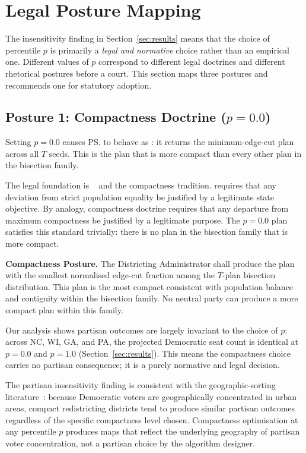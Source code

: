 \section{Legal Posture Mapping}
\label{sec:legal-posture}

The insensitivity finding in Section~\ref{sec:results} means that the choice
of percentile $p$ is primarily a \emph{legal and normative} choice rather
than an empirical one.
Different values of $p$ correspond to different legal doctrines and different
rhetorical postures before a court.
This section maps three postures and recommends one for statutory adoption.

\subsection{Posture 1: Compactness Doctrine ($p = 0.0$)}

Setting $p = 0.0$ causes \ps{} to behave as \cs{}: it returns the
minimum-edge-cut plan across all $T$ seeds.
This is the plan that is more compact than every other plan in the bisection
family.

The legal foundation is \karcher{}~\citep{karcher1983} and the compactness
tradition.
\karcher{} requires that any deviation from strict population equality be
justified by a legitimate state objective.
By analogy, compactness doctrine requires that any departure from maximum
compactness be justified by a legitimate purpose.
The $p = 0.0$ plan satisfies this standard trivially: there is no plan in
the bisection family that is more compact.

\begin{statute}
\textbf{Compactness Posture.}
The Districting Administrator shall produce the plan with the smallest
normalised edge-cut fraction among the $T$-plan bisection distribution.
This plan is the most compact consistent with population balance and
contiguity within the \ar{} bisection family.
No neutral party can produce a more compact plan within this family.
\end{statute}

Our analysis shows partisan outcomes are largely invariant to the choice of
$p$: across NC, WI, GA, and PA, the projected Democratic seat count is
identical at $p = 0.0$ and $p = 1.0$ (Section~\ref{sec:results}).
This means the compactness choice carries no partisan consequence; it is a
purely normative and legal decision.

The partisan insensitivity finding is consistent with the
geographic-sorting literature~\cite{rodden2019cities}: because Democratic
voters are geographically concentrated in urban areas, compact redistricting
districts tend to produce similar partisan outcomes regardless of the
specific compactness level chosen.
Compactness optimisation at any percentile $p$ produces maps that reflect
the underlying geography of partisan voter concentration, not a partisan
choice by the algorithm designer.

